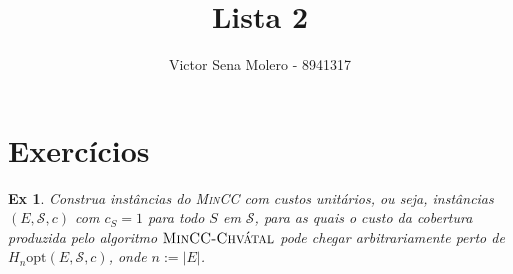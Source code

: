 \documentclass[12pt]{article}
\newcounter{exCounter}
\newtheorem{ex}[exCounter]{Ex}
\begin{document}
 
 
\title{Lista 2}
\author{Victor Sena Molero - 8941317}
\maketitle

\section{Exercícios}
\begin{ex}
Construa instâncias do \textsc{MinCC} com custos unitários, ou seja, instâncias $(E,\mathcal{S},c)$ com $c_S = 1$ para todo $S$ em $\mathcal{S}$, para as quais o custo da cobertura produzida pelo algoritmo $\textsc{MinCC-Chvátal}$ pode chegar arbitrariamente perto de $H_n\mathrm{opt}(E,\mathcal{S},c)$, onde $n := |E|$.
\end{ex}
\end{document}
